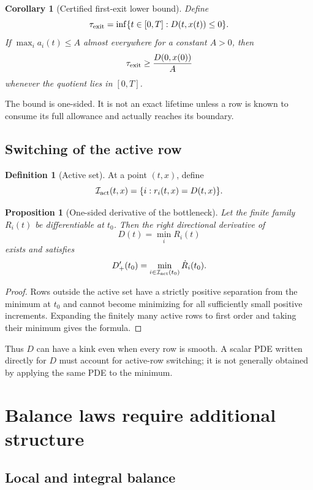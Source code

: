 \documentclass[11pt]{article}
\newtheorem{proposition}[theorem]{Proposition}
\newtheorem{corollary}[theorem]{Corollary}
\theoremstyle{definition}
\newtheorem{definition}[theorem]{Definition}
\theoremstyle{remark}
\newcommand{\cI}{\mathcal I}
\begin{document}
\begin{corollary}[Certified first-exit lower bound]
\label{cor:exit}
Define
\[
 \tau_{\rm exit}
 =
 \inf\{t\in[0,T]:D(t,x(t))\le0\}.
\]
If \(\max_i a_i(t)\le A\) almost everywhere for a constant \(A>0\), then
\[
 \tau_{\rm exit}\ge\frac{D(0,x(0))}{A}
\]
whenever the quotient lies in \([0,T]\).
\end{corollary}

The bound is one-sided.  It is not an exact lifetime unless a row is known
to consume its full allowance and actually reaches its boundary.

\subsection{Switching of the active row}

\begin{definition}[Active set]
At a point \((t,x)\), define
\[
 \cI_{\rm act}(t,x)
 =
 \{i:r_i(t,x)=D(t,x)\}.
\]
\end{definition}

\begin{proposition}[One-sided derivative of the bottleneck]
\label{prop:min}
Let the finite family \(R_i(t)\) be differentiable at \(t_0\).  Then the
right directional derivative of
\[
 D(t)=\min_iR_i(t)
\]
exists and satisfies
\[
 D'_+(t_0)
 =
 \min_{i\in\cI_{\rm act}(t_0)}\dot R_i(t_0).
\]
\end{proposition}

\begin{proof}
Rows outside the active set have a strictly positive separation from the
minimum at \(t_0\) and cannot become minimizing for all sufficiently small
positive increments.  Expanding the finitely many active rows to first
order and taking their minimum gives the formula.
\end{proof}

Thus \(D\) can have a kink even when every row is smooth.  A scalar PDE
written directly for \(D\) must account for active-row switching; it is not
generally obtained by applying the same PDE to the minimum.

\section{Balance laws require additional structure}
\label{sec:balance}

\subsection{Local and integral balance}
\end{document}

